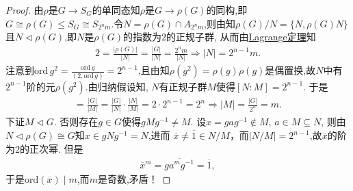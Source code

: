 \documentclass[../../main.tex]{subfiles}%
\begin{document}
\begin{proof}
由$\rho$是$G\to S_G$的单同态知$\rho$是$G\to \rho(G)$的同构,即$G\cong \rho(G)\leqslant S_G\cong S_{2^nm}$.令$N = \rho(G) \cap A_{2^n m}$,则由知$\rho(G)/N=\{N,\rho(G)N\}$且$N\lhd \rho(G)$,即$N$是$\rho(G)$的指数为$2$的正规子群, 从而由\hyperref[theorem:抽象代数--Lagrange定理]{Lagrange定理}知
\begin{align*}
2=\frac{|\rho(G)|}{|N|} = \frac{|G|}{|N|}=\frac{2^nm}{|N|} \Longrightarrow |N|=2^{n-1}m.
\end{align*}
注意到$\text{ord}\,g^2=\frac{\text{ord}\,g}{(2,\text{ord}\,g)}=2^{n-1}$,且由知$\rho(g^2)=\rho(g)\rho(g)$是偶置换,故$N$中有$2^{n-1}$阶的元$\rho(g^2)$.由归纳假设知, $N$有正规子群$M$使得$[N:M]=2^{n-1}$. 于是
\begin{align*}
[G:M]=\frac{|G|}{|M|}=\frac{|G|}{|N|}\cdot \frac{|N|}{|M|}=2\cdot 2^{n-1}=2^n\Longrightarrow |M|=\frac{|G|}{2^n}=m.
\end{align*}
下证$M \lhd G$. 否则存在$g \in G$使得$gMg^{-1} \neq M$. 设$x = gag^{-1} \notin M$, $a \in M\subseteq N$, 则由$N\lhd \rho(G)\cong G$知$x \in gNg^{-1} = N$,进而 $\overline{x} \neq \overline{1} \in N/M$，而$|N/M|=2^{n-1}$,故$\overline{x}$的阶为$2$的正次幂. 但是
\begin{align*}
\overline{x}^m = \overline{ga^m g^{-1}} = \overline{1},
\end{align*}
于是$\text{ord}(\overline{x}) \mid m$,而$m$是奇数,矛盾！
\end{proof}
\end{document}
